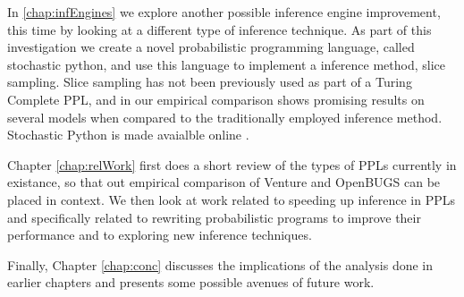 In \ref{chap:infEngines} we explore another possible inference engine improvement, this time by looking at a different type of inference technique. As part of this investigation we create a novel probabilistic programming language, called stochastic python, and use this language to implement a inference method, slice sampling. Slice sampling has not been previously used as part of a Turing Complete PPL, and in our empirical comparison shows promising results on several models when compared to the traditionally employed inference method. Stochastic Python is made avaialble online \cite{stocPy}. 

Chapter \ref{chap:relWork} first does a short review of the types of PPLs currently in existance, so that out empirical comparison of Venture and OpenBUGS can be placed in context. We then look at work related to speeding up inference in PPLs and specifically related to rewriting probabilistic programs to improve their performance and to exploring new inference techniques. 

Finally, Chapter \ref{chap:conc} discusses the implications of the analysis done in earlier chapters and presents some possible avenues of future work.
